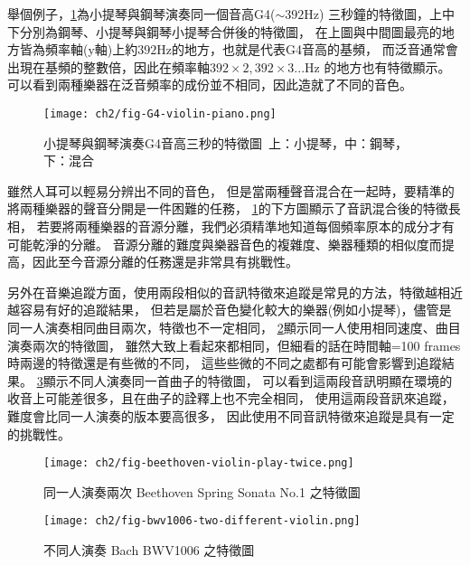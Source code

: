 \documentclass[class=NCU_thesis, crop=false]{standalone}
\begin{document}
舉個例子，\cref{fig:fig-ch2-G4-violin-piano}為小提琴與鋼琴演奏同一個音高G4($\sim 392$Hz)
三秒鐘的特徵圖，上中下分別為鋼琴、小提琴與鋼琴小提琴合併後的特徵圖，
在上圖與中間圖最亮的地方皆為頻率軸(y軸)上約$392$Hz的地方，也就是代表G4音高的基頻，
而泛音通常會出現在基頻的整數倍，因此在頻率軸$392\times 2, 392\times 3 ...$Hz
的地方也有特徵顯示。可以看到兩種樂器在泛音頻率的成份並不相同，因此造就了不同的音色。

\begin{figure}[H]
    \centering
    \texttt{[image: ch2/fig-G4-violin-piano.png]}
    \caption{小提琴與鋼琴演奏G4音高三秒的特徵圖\ 上：小提琴，中：鋼琴，下：混合}
    \label{fig:fig-ch2-G4-violin-piano}
\end{figure}

雖然人耳可以輕易分辨出不同的音色，
但是當兩種聲音混合在一起時，要精準的將兩種樂器的聲音分開是一件困難的任務，
\cref{fig:fig-ch2-G4-violin-piano}的下方圖顯示了音訊混合後的特徵長相，
若要將兩種樂器的音源分離，我們必須精準地知道每個頻率原本的成分才有可能乾淨的分離。
音源分離的難度與樂器音色的複雜度、樂器種類的相似度而提高，因此至今音源分離的任務還是非常具有挑戰性。

另外在音樂追蹤方面，使用兩段相似的音訊特徵來追蹤是常見的方法，特徵越相近越容易有好的追蹤結果，
但若是屬於音色變化較大的樂器(例如小提琴)，儘管是同一人演奏相同曲目兩次，特徵也不一定相同，
\cref{fig:fig-ch2-beethoven-violin-play-twice}顯示同一人使用相同速度、曲目演奏兩次的特徵圖，
雖然大致上看起來都相同，但細看的話在時間軸=100 frames時兩邊的特徵還是有些微的不同，
這些些微的不同之處都有可能會影響到追蹤結果。
\cref{fig:fig-ch2-bwv1006-two-different-violin}顯示不同人演奏同一首曲子的特徵圖，
可以看到這兩段音訊明顯在環境的收音上可能差很多，且在曲子的詮釋上也不完全相同，
使用這兩段音訊來追蹤，難度會比同一人演奏的版本要高很多，
因此使用不同音訊特徵來追蹤是具有一定的挑戰性。

\begin{figure}[H]
    \centering
    \texttt{[image: ch2/fig-beethoven-violin-play-twice.png]}
    \caption{同一人演奏兩次 Beethoven Spring Sonata No.1 之特徵圖}
    \label{fig:fig-ch2-beethoven-violin-play-twice}
\end{figure}

\begin{figure}[H]
    \centering
    \texttt{[image: ch2/fig-bwv1006-two-different-violin.png]}
    \caption{不同人演奏 Bach BWV1006 之特徵圖}
    \label{fig:fig-ch2-bwv1006-two-different-violin}
\end{figure}
\end{document}
